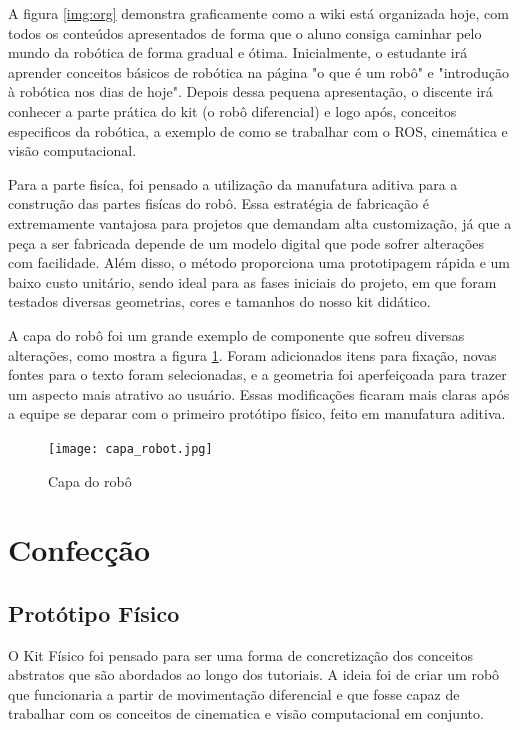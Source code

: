 A figura \ref{img:org} demonstra graficamente como a wiki está organizada hoje, com todos os conteúdos apresentados de forma que o aluno consiga caminhar pelo mundo da robótica de forma gradual e ótima. Inicialmente, o estudante irá aprender conceitos básicos de robótica na página "o que é um robô" e "introdução à robótica nos dias de hoje". Depois dessa pequena apresentação, o discente irá conhecer a parte prática do kit (o robô diferencial) e logo após, conceitos especificos da robótica, a exemplo de como se trabalhar com o ROS, cinemática e visão computacional.

Para a parte fisíca, foi pensado a utilização da manufatura aditiva para a construção das partes fisícas do robô. Essa estratégia de fabricação é extremamente vantajosa para projetos que demandam alta customização, já que a peça a ser fabricada depende de um modelo digital que pode sofrer alterações com facilidade. Além disso, o método proporciona uma prototipagem rápida e um baixo custo unitário, sendo ideal para as fases iniciais do projeto, em que foram testados diversas geometrias, cores e tamanhos do nosso kit didático.

A capa do robô foi um grande exemplo de componente que sofreu diversas alterações, como mostra a figura \ref{img:cap_rob}. Foram adicionados itens para fixação, novas fontes para o texto foram selecionadas, e a geometria foi aperfeiçoada para trazer um aspecto mais atrativo ao usuário. Essas modificações ficaram mais claras após a equipe se deparar com o primeiro protótipo físico, feito em manufatura aditiva. 

\begin{figure}[!h]                                                
	\centering        
	\texttt{[image: capa\_robot.jpg]}            
	\caption{Capa do robô}        
	\label{img:cap_rob}    
\end{figure}

\section{Confecção}
\subsection{Protótipo Físico}
O Kit Físico foi pensado para ser uma forma de concretização dos conceitos abstratos que são abordados ao longo dos tutoriais. A ideia foi de criar um robô que funcionaria a partir de movimentação diferencial e que fosse capaz de trabalhar com os conceitos de cinematica e visão computacional em conjunto.

